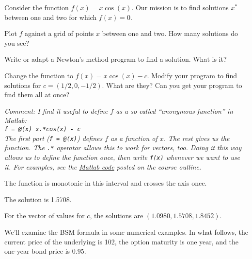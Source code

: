\documentclass[11pt]{exam}
\begin{document}
\begin{questions}
Consider the function $f(x) = x \cos(x) $.
Our mission is to find solutions $x^*$
between one and two for which $f(x) = 0$.
%
\begin{parts}
\item Plot $f$ against  a grid of points $x$ between one and two.
How many solutions do you see?
\item Write or adapt a Newton's method program to find a solution.
What is it?
\item Change the function to $f(x) = x \cos(x) - c$.
Modify your program to find solutions
for $ c = (1/2, 0, -1/2)$.
What are they?
Can you get your program to find them all at once?
\end{parts}
{\it Comment: I find it useful to define $f$
as a so-called ``anonymous function'' in Matlab: \\
{\tt f = @(x) x.*cos(x) - c }\\
The first part ({\tt f = @(x)}) defines $f$ as a function of $x$.
The rest gives us the function.
The {\tt .*} operator allows this to work for vectors, too.
Doing it this way allows us to define the function once,
then write {\tt f(x)} whenever we want to use it.
For examples, see the
\href{http://pages.stern.nyu.edu/~dbackus/233/root_finding_pjb.m}{Matlab code}
posted on the course outline.
}

\begin{solution}
\begin{parts}
\item The function is monotonic in this interval
and crosses the axis once.
\item The solution is 1.5708.
\item For the vector of values for $c$,
the solutions are $( 1.0980, 1.5708, 1.8452)$.
\end{parts}
\end{solution}

We'll examine the BSM formula in some numerical examples.
In what follows, the current price of the underlying
is 102, the option maturity is one year, and the one-year bond price is 0.95.
\end{questions}
\end{document}
